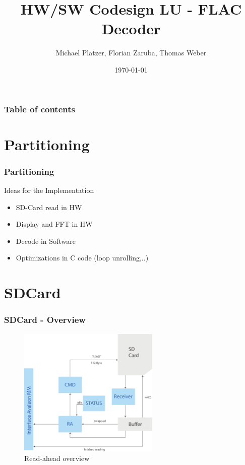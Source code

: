 \documentclass{beamer}
\begin{document}
\title[Entwurssprachen]{HW/SW Codesign LU - FLAC Decoder}
\author[Platzer M., Zaruba F., Weber T.]{Michael Platzer, Florian Zaruba, Thomas Weber}
\date{\today}

\begin{frame}
\titlepage
\end{frame}

\begin{frame}\frametitle{Table of contents}
  \tableofcontents
\end{frame}

\section{Partitioning} 
\begin{frame}\frametitle{Partitioning} 
Ideas for the Implementation
\begin{itemize}
	\item SD-Card read in HW
	\item Display and FFT in HW
	\item Decode in Software
	\item Optimizations in C code (loop unrolling,..)
\end{itemize}
\end{frame}

\section{SDCard}
\begin{frame}\frametitle{SDCard - Overview}
\begin{figure}[hp]
      \centering
      \includegraphics[width=0.6\textwidth]{pictures/read_ahead_overview}
      \caption{Read-ahead overview}
      \label{fig:fft_display_struct}
    \end{figure}
\end{frame}
\end{document}
